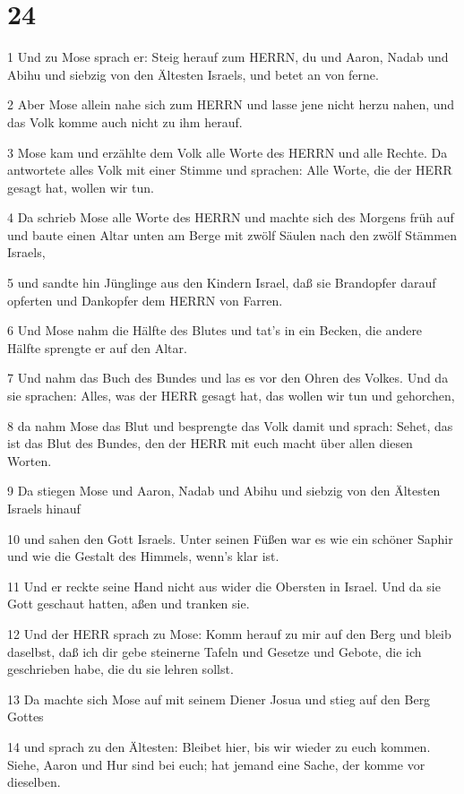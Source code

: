 \chapter{24}

\par 1 Und zu Mose sprach er: Steig herauf zum HERRN, du und Aaron, Nadab und Abihu und siebzig von den Ältesten Israels, und betet an von ferne.
\par 2 Aber Mose allein nahe sich zum HERRN und lasse jene nicht herzu nahen, und das Volk komme auch nicht zu ihm herauf.
\par 3 Mose kam und erzählte dem Volk alle Worte des HERRN und alle Rechte. Da antwortete alles Volk mit einer Stimme und sprachen: Alle Worte, die der HERR gesagt hat, wollen wir tun.
\par 4 Da schrieb Mose alle Worte des HERRN und machte sich des Morgens früh auf und baute einen Altar unten am Berge mit zwölf Säulen nach den zwölf Stämmen Israels,
\par 5 und sandte hin Jünglinge aus den Kindern Israel, daß sie Brandopfer darauf opferten und Dankopfer dem HERRN von Farren.
\par 6 Und Mose nahm die Hälfte des Blutes und tat's in ein Becken, die andere Hälfte sprengte er auf den Altar.
\par 7 Und nahm das Buch des Bundes und las es vor den Ohren des Volkes. Und da sie sprachen: Alles, was der HERR gesagt hat, das wollen wir tun und gehorchen,
\par 8 da nahm Mose das Blut und besprengte das Volk damit und sprach: Sehet, das ist das Blut des Bundes, den der HERR mit euch macht über allen diesen Worten.
\par 9 Da stiegen Mose und Aaron, Nadab und Abihu und siebzig von den Ältesten Israels hinauf
\par 10 und sahen den Gott Israels. Unter seinen Füßen war es wie ein schöner Saphir und wie die Gestalt des Himmels, wenn's klar ist.
\par 11 Und er reckte seine Hand nicht aus wider die Obersten in Israel. Und da sie Gott geschaut hatten, aßen und tranken sie.
\par 12 Und der HERR sprach zu Mose: Komm herauf zu mir auf den Berg und bleib daselbst, daß ich dir gebe steinerne Tafeln und Gesetze und Gebote, die ich geschrieben habe, die du sie lehren sollst.
\par 13 Da machte sich Mose auf mit seinem Diener Josua und stieg auf den Berg Gottes
\par 14 und sprach zu den Ältesten: Bleibet hier, bis wir wieder zu euch kommen. Siehe, Aaron und Hur sind bei euch; hat jemand eine Sache, der komme vor dieselben.
